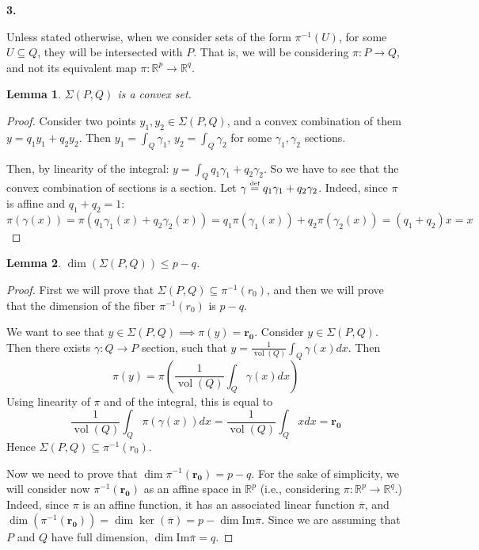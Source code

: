\documentclass[10pt,a4paper]{article}
\DeclareMathOperator{\vol}{vol}
\def\defs{\stackrel{\tiny{\mbox{def}}}{=}}		%
\newcommand{\RR}{\mathbb{R}}
\theoremstyle{plain}
\newtheorem{lemma}{Lemma}
\theoremstyle{remark}
\theoremstyle{definition}
\begin{document}
\textbf{3. }

Unless stated otherwise, 
when we consider sets of the form
$\pi^{-1}(U)$, for some $U\subseteq Q$,
they will be intersected with $P$.
That is, we will be considering $\pi\colon P\to Q$, 
and not its equivalent map $\pi\colon \RR^p\to\RR^q$.

\begin{lemma}
	\label{clm:convex}
	$\Sigma(P,Q)$ is a convex set.
\end{lemma}
\begin{proof}
	Consider two points $y_1,y_2 \in \Sigma(P,Q)$,
	and a convex combination of them $y= q_1y_1 + q_2y_2$. 
	Then $y_1 = \int_Q \gamma_1$, $y_2 = \int_Q \gamma_2$ 
	for some $\gamma_1,\gamma_2$ sections. 
	
	Then, by linearity of the integral:
	$y = \int_Q q_1\gamma_1 +q_2\gamma_2$. 
	So we have to see that the convex combination of sections is a section.
	Let $\gamma \defs q_1\gamma_1 +q_2\gamma_2$. 
	Indeed, since $\pi$ is affine and $q_1+q_2 = 1$:
	\begin{equation}
		\pi(\gamma(x)) = 
		\pi(q_1\gamma_1(x) + q_2\gamma_2(x)) =
		 q_1\pi(\gamma_1(x)) + q_2\pi(\gamma_2(x)) =
 		(q_1+q_2)x = x
	\end{equation}
\end{proof}

\begin{lemma}
	$\dim(\Sigma(P,Q)) \leq p-q$.
\end{lemma}
\begin{proof}
	First we will prove that 
	$\Sigma(P,Q) \subseteq \pi^{-1}(r_0)$,
	and then we will prove that the dimension of the 
	fiber $\pi^{-1}(r_0)$ is $p-q$.\par	
	We want to see that 
	$y\in\Sigma(P,Q) \implies \pi(y) = \bm{r_0}$.
	Consider $y\in \Sigma(P,Q)$. 
	Then there exists $\gamma:Q\to P$ section,
	such that 
	$y =\frac1{\vol(Q)} \int_Q \gamma(x)dx$.
	Then
	\begin{equation}
		\pi(y) = \pi\left(\frac{1}{\vol(Q)} \int_Q \gamma(x)dx\right)
	\end{equation}
	Using linearity of $\pi$ and of the integral, 
	this is equal to
	\begin{equation}
	\frac{1}{\vol(Q)}\int_Q \pi(\gamma(x))dx 
	= \frac{1}{\vol(Q)}\int_Q xdx 
	= \bm{r_0}
	\end{equation} 	
	Hence $\Sigma(P,Q) \subseteq \pi^{-1}(r_0)$.
		
	Now we need to prove that 
	$\dim \pi^{-1}(\bm{r_0}) = p-q$. 
	For the sake of simplicity, 
	we will consider now $\pi^{-1}(\bm{r_0})$ as an affine
	space in $\RR^p$ (i.e., considering $\pi\colon\RR^p\to\RR^q$.)	
	Indeed, since $\pi$ is an affine function, 
	it has an associated linear function $\overline{\pi}$,
	and
	$\dim(\pi^{-1}(\bm{r_0})) = \dim \ker(\overline\pi) =
	 p - \dim \mbox{Im} \overline\pi$.
	Since we are assuming that $P$ and $Q$ have full dimension,
	${\dim\mbox{Im}\overline\pi=q}$.
\end{proof}
\end{document}
